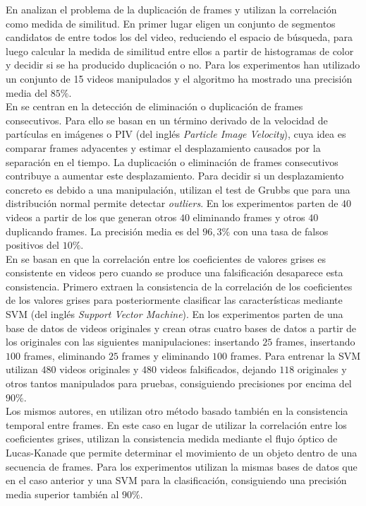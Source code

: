 En \cite{chang:2013} analizan el problema de la duplicación de frames y utilizan la correlación como medida de similitud. En primer lugar eligen un conjunto de segmentos candidatos de entre todos los del video, reduciendo el espacio de búsqueda, para luego calcular la medida de similitud entre ellos a partir de histogramas de color y decidir si se ha producido duplicación o no. Para los experimentos han utilizado un conjunto de 15 videos manipulados y el algoritmo ha mostrado una precisión media del $85\%$. \\

En \cite{wu:2014} se centran en la detección de eliminación o duplicación de frames consecutivos. Para ello se basan en un término derivado de la velocidad de partículas en imágenes o PIV (del inglés \textit{Particle Image Velocity}), cuya idea es comparar frames adyacentes y estimar el desplazamiento causados por la separación en el tiempo. La duplicación o eliminación de frames consecutivos contribuye a aumentar este desplazamiento. Para decidir si un desplazamiento concreto es debido a una manipulación, utilizan el test de Grubbs\cite{wiki:grubbs} que para una distribución normal permite detectar \textit{outliers}. En los experimentos parten de $40$ videos a partir de los que generan otros $40$ eliminando frames y otros $40$ duplicando frames. La precisión media es del $96,3\%$ con una tasa de falsos positivos del $10\%$. \\

En \cite{wang:2014} se basan en que la correlación entre los coeficientes de valores grises es consistente en videos pero cuando se produce una falsificación desaparece esta consistencia. Primero extraen la consistencia de la correlación de los coeficientes de los valores grises para posteriormente clasificar las características mediante SVM (del inglés \textit{Support Vector Machine}). En los experimentos parten de una base de datos de videos originales y crean otras cuatro bases de datos a partir de los originales con las siguientes manipulaciones: insertando $25$ frames, insertando $100$ frames, eliminando $25$ frames y eliminando $100$ frames. Para entrenar la SVM utilizan $480$ videos originales y $480$ videos falsificados, dejando $118$ originales y otros tantos manipulados para pruebas, consiguiendo precisiones por encima del $90\%$. \\

Los mismos autores, en \cite{flow:2014} utilizan otro método basado también en la consistencia temporal entre frames. En este caso en lugar de utilizar la correlación entre los coeficientes grises, utilizan la consistencia medida mediante el flujo óptico de Lucas-Kanade que permite determinar el movimiento de un objeto dentro de una secuencia de frames. Para los experimentos utilizan la mismas bases de datos que en el caso anterior y una SVM para la clasificación, consiguiendo una precisión media superior también al $90\%$. \\

